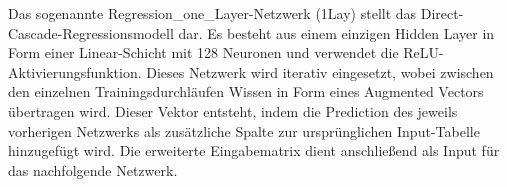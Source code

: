 Das sogenannte Regression\_one\_Layer-Netzwerk (1Lay) stellt das Direct-Cascade-Regressionsmodell dar. Es besteht aus einem einzigen Hidden 
Layer in Form einer 
Linear-Schicht mit 128 Neuronen und verwendet die ReLU-Aktivierungsfunktion. Dieses Netzwerk wird iterativ eingesetzt, wobei zwischen den 
einzelnen Trainingsdurchläufen Wissen in Form eines Augmented Vectors übertragen wird. Dieser Vektor entsteht, indem die Prediction des 
jeweils vorherigen Netzwerks als zusätzliche Spalte zur ursprünglichen Input-Tabelle hinzugefügt wird. Die erweiterte Eingabematrix dient 
anschließend als Input für das nachfolgende Netzwerk.
